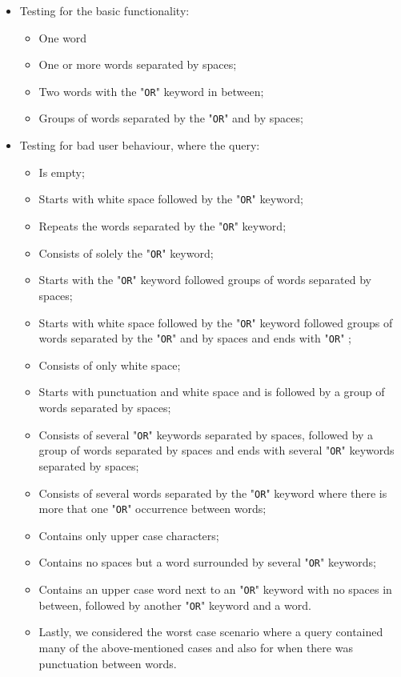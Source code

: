 \begin{itemize}
    \item Testing for the basic functionality:
        \begin{itemize}
            \item One word
            \item One or more words separated by spaces;
            \item Two words with the "{\tt OR}" keyword in between;
            \item Groups of words separated by the "{\tt OR}" and by spaces;
        \end{itemize}
    \item Testing for bad user behaviour, where the query:
    \begin{itemize}
        \item Is empty;
        \item Starts with white space followed by the "{\tt OR}" keyword;
        \item Repeats the words separated by the "{\tt OR}" keyword;
        \item Consists of solely the "{\tt OR}" keyword;
        \item Starts with the "{\tt OR}" keyword followed groups of words separated by spaces;
        \item Starts with white space followed by the "{\tt OR}" keyword followed groups of words separated by the "{\tt OR}" and by spaces and ends with "{\tt OR}" ;
        \item Consists of only white space;
        \item Starts with punctuation and white space and is followed by a group of words separated by spaces;
        \item Consists of several "{\tt OR}" keywords separated by spaces, followed by a group of words separated by spaces and ends with several "{\tt OR}" keywords separated by spaces;
        \item Consists of several words separated by the "{\tt OR}" keyword where there is more that one "{\tt OR}" occurrence between words;
        \item Contains only upper case characters;
        \item Contains no spaces but a word surrounded by several "{\tt OR}" keywords;
        \item Contains an upper case word next to an "{\tt OR}" keyword with no spaces in between, followed by another "{\tt OR}" keyword and a word.
        \item Lastly, we considered the worst case scenario where a query contained many of the above-mentioned cases and also for when there was punctuation between words.
    \end{itemize}
\end{itemize}


